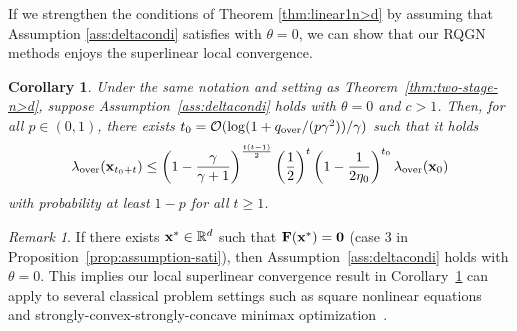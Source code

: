 \documentclass[11pt]{article}
\theoremstyle{plain}
\newtheorem{corollary}[theorem]{Corollary}
\theoremstyle{definition}
\theoremstyle{remark}
\newtheorem{remark}[theorem]{Remark}
\theoremstyle{plain}
\def\vx{{\bf{x}}}
\def\BR{{\mathbb{R}}}
\def\vx {{{\bf x}}}
\def\BR{{\mathbb{R}}}
\def\F{{\bf F}}
\def\x{{\bf x}}
\def\0{{\bf 0}}
\def\OM{{\mathcal O}}
\begin{document}
If we strengthen the conditions of Theorem \ref{thm:linear1n>d} by assuming that Assumption \ref{ass:deltacondi} satisfies with $\theta=0$, we can show that our RQGN methods enjoys the superlinear local convergence.

\begin{corollary}
\label{col:theta=0n>d}
Under the same notation and setting as Theorem~\ref{thm:two-stage-n>d}, suppose Assumption~\ref{ass:deltacondi} holds with $\theta=0$ and $c>1$.
Then, for all $p\in(0,1)$, there exists $t_0=\OM(\log(1+q_{\text{\rm over}}/(p\gamma^2))/\gamma)$ such that it holds
\begin{align*}
\lambda_{\mathrm{over}}(\x_{t_0+t})\leq \left(1-\frac{\gamma}{\gamma+1}\right)^{\frac{t(t-1)}{2}}\left(\frac{1}{2}\right)^t\left(1-\frac{1}{2\eta_0}\right)^{t_0}\lambda_{\mathrm{over}}(\x_0)
\end{align*}
with probability at least $1-p$ for all $t\geq1$.
\end{corollary}

\begin{remark}
    If there exists $\vx^*\in\BR^d$ such that $\F(\x^*)=\0$ (case 3 in Proposition~\ref{prop:assumption-sati}), then Assumption~\ref{ass:deltacondi} holds with $\theta = 0$.            
    This implies our local superlinear convergence result in Corollary~\ref{col:theta=0n>d} can apply to several classical problem settings such as  square nonlinear equations~\citep{lin2021explicit,liu2023block} and strongly-convex-strongly-concave minimax optimization~\citep{liu2022quasi}.
\end{remark}
 


\end{document}
